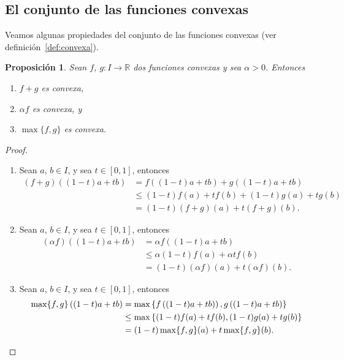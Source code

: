 \documentclass[11pt]{article}
\numberwithin{equation}{section}
\theoremstyle{plain}
\newtheorem{proposicion}[teorema]{Proposición}
\theoremstyle{definition}
\theoremstyle{remark}
\begin{document}
\subsection{El conjunto de las funciones convexas}

Veamos algunas propiedades del conjunto de las funciones convexas (ver definición~\ref{def:convexa}).

\begin{proposicion}
 Sean $f$, $g \colon I \rightarrow \mathbb{R}$ dos funciones convexas y
 sea $\alpha>0$. Entonces
 \begin{enumerate}
  \item $f+g$ es convexa,
  \item $\alpha f$ es convexa, y
  \item $\max \{f ,g\}$ es convexa.
 \end{enumerate}
\end{proposicion}
\begin{proof}
 \begin{enumerate}
  \item Sean $a$, $b\in I$, y sea $t\in [0,1]$, entonces
        \begin{equation}
         \begin{split}
          (f+g) \left( (1-t)a+tb \right) & = f \left( (1-t)a+tb \right) + g \left( (1-t)a+tb \right)\\
          & \leq (1-t)f(a)+tf(b)+(1-t)g(a)+t g(b) \\
          & = (1-t)(f+g)(a) + t(f+g)(b).
         \end{split}
        \end{equation}
  \item Sean $a$, $b\in I$, y sea $t\in [0,1]$, entonces
        \begin{equation}
         \begin{aligned}
          (\alpha f) \left( (1-t)a+tb \right) & = \alpha f \left( (1-t)a+tb \right)     \\
                                              & \leq \alpha (1-t)f(a)+ \alpha t f(b)    \\
                                              & = (1-t)(\alpha f)(a) + t (\alpha f)(b).
         \end{aligned}
        \end{equation}
  \item Sean $a$, $b\in I$, y sea $t\in [0,1]$, entonces
        \[
         \begin{aligned}
          \max \{ f,g\} \left( (1-t)a+tb \right) & = \max \left\{ f\left( (1-t)a+tb) \right),g \left((1-t)a+tb\right) \right\} \\
                                                 & \leq \max \left\{ (1-t)f(a)+tf(b),(1-t)g(a)+t g(b) \right\}                 \\
                                                 & = (1-t) \max\{f,g\}(a) + t \max\{ f,g\} (b). \qedhere
         \end{aligned}
        \]
 \end{enumerate}
\end{proof}
\end{document}
